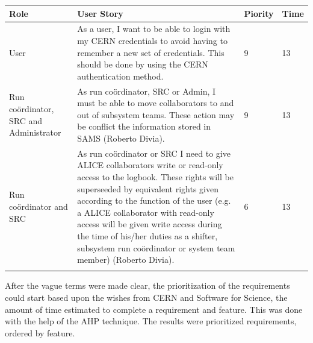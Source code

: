 \documentclass[paper=a4, fontsize=11pt,twoside]{scrartcl}	%
\begin{document}
\begin{longtable}{ | p{3cm} | p{8cm} | p{1cm} | l |}
\hline
Role & User Story & Piority & Time \\ \hline
User & As a user, I want to be able to login with my CERN credentials to avoid having to remember a new set of credentials. This should be done by using the CERN authentication method. & 9 & 13 \\ \hline
Run coördinator, SRC and Administrator &  As run coördinator, SRC or Admin, I must be able to move collaborators to and out of subsystem teams. These action may be conflict the information stored in SAMS (Roberto Divia). & 9 & 13 \\ \hline
Run coördinator and SRC &  As run coördinator or SRC I need to give ALICE collaborators write or read-only access to the logbook. These rights will be superseeded by equivalent rights given according to the function of the user (e.g. a ALICE collaborator with read-only access will be given write access during the time of his/her duties as a shifter, subsystem run coördinator or system team member) (Roberto Divia).&6&13 \\ \hline

\label{table:hans}
\end{longtable}

After the vague terms were made clear, the prioritization of the requirements could start based upon the wishes from CERN and Software for Science, the amount of time estimated to complete a requirement and feature. This was done with the help of the AHP technique. The results were prioritized requirements, ordered by feature. 
\newpage
\end{document}
